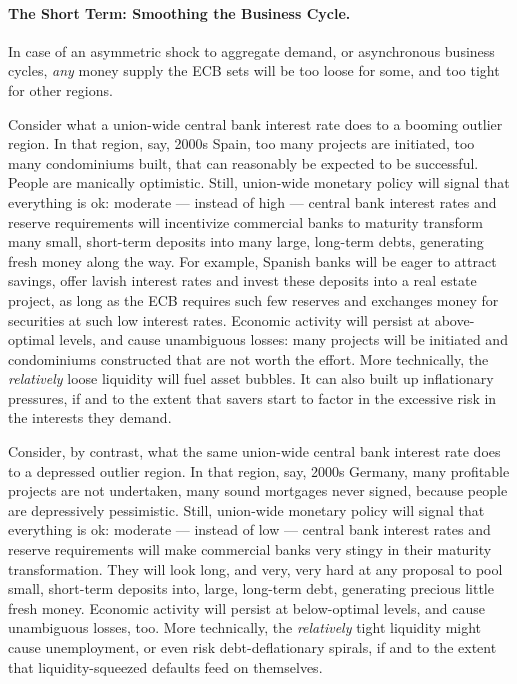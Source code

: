 \documentclass[11pt,a4paper,oneside]{article}
\begin{document}
\paragraph[Short Term]{The Short Term: 
Smoothing the Business Cycle.}
In case of an asymmetric shock to aggregate demand, or asynchronous business cycles, \emph{any} money supply the \gls{ECB} sets will be too loose for some, and too tight for other regions. 

Consider what a union-wide central bank interest rate does to a booming outlier region. 
In that region, say, 2000s Spain, too many projects are initiated, too many condominiums built, that can reasonably be expected to be successful. 
People are manically optimistic. 
Still, union-wide monetary policy will signal that everything is ok: 
moderate --- instead of high --- central bank interest rates and reserve requirements will incentivize commercial banks to maturity transform many small, short-term deposits into many large, long-term debts, generating fresh money along the way. 
For example, Spanish banks will be eager to attract savings, offer lavish interest rates and invest these deposits into a real estate project, as long as the \gls{ECB} requires such few reserves and exchanges money for securities at such low interest rates. 
Economic activity will persist at above-optimal levels, and cause unambiguous losses: 
many projects will be initiated and condominiums constructed that are not worth the effort. 
More technically, the \emph{relatively} loose liquidity will fuel asset bubbles.
It can also built up inflationary pressures, if and to the extent that savers start to factor in the excessive risk in the interests they demand.

Consider, by contrast, what the same union-wide central bank interest rate does to a depressed outlier region. 
In that region, say, 2000s Germany, many profitable projects are not undertaken, many sound mortgages never signed, because people are depressively pessimistic. 
Still, union-wide monetary policy will signal that everything is ok: 
moderate --- instead of low --- central bank interest rates and reserve requirements will make commercial banks very stingy in their maturity transformation. 
They will look long, and very, very hard at any proposal to pool small, short-term deposits into, large, long-term debt, generating precious little fresh money. 
Economic activity will persist at below-optimal levels, and cause unambiguous losses, too. 
More technically, the \emph{relatively} tight liquidity might cause unemployment, or even risk debt-deflationary spirals, if and to the extent that liquidity-squeezed defaults feed on themselves.
\end{document}
